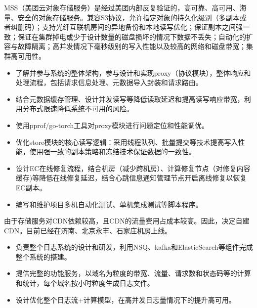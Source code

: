 \documentclass{resume}
\begin{document}
MSS（美团云对象存储服务）是经过美团内部反复验证的，高可靠、高可用、海量、安全的对象存储服务。兼容S3协议，允许指定对象的持久化级别（多副本或者纠删码）；支持光纤互联机房间的异地备份和本地读写优化；保证副本之间强一致；保证在集群掉电或少于设计数量的磁盘损坏的情况下数据不丢失；自动化的扩容与故障隔离；高并发情况下毫秒级别的写入性能以及较高的网络和磁盘带宽；集群高可用性。
\begin{itemize}
  \item 了解并参与系统的整体架构，参与设计和实现proxy（协议模块），整体响应和处理流程，包括请求信息处理、元数据导入封装和请求路由。
  \item 结合元数据缓存管理、设计并发读写等降低读取延迟和提高读写响应带宽，利用分布式限速降低系统不可用的风险。
  \item 使用pprof/go-torch工具对proxy模块进行问题定位和性能调优。
  \item 优化store模块的核心读写逻辑：采用线程队列、批量提交等技术提高写入性能，使用强一致的副本策略和冻结技术保证数据的一致性。
  \item 设计EC在线修复流程，结合机房（减少跨机房）、计算修复节点（对修复内容缓存)等降低在线修复延迟，结合心跳信息通知管理节点开启离线修复以恢复EC副本。
  \item 编写和维护项目多机自动化测试、单机集成测试等脚本程序。
\end{itemize}

由于存储服务对CDN依赖较高，且CDN的流量费用占成本较高。因此，决定自建CDN。目前已经在济南、北京永丰、石家庄机房上线。
\begin{itemize}
  \item 负责整个日志系统的设计和研发，利用NSQ、kafka和ElasticSearch等组件完成整个系统的搭建。
  \item 提供完整的功能服务，以域名为粒度的带宽、流量、请求数和状态码等的计算和统计，每个域名按小时粒度生成日志文件。
  \item 设计优化整个日志流+计算模型，在高并发日志量情况下的提升高可用。
\end{itemize}

\end{document}
